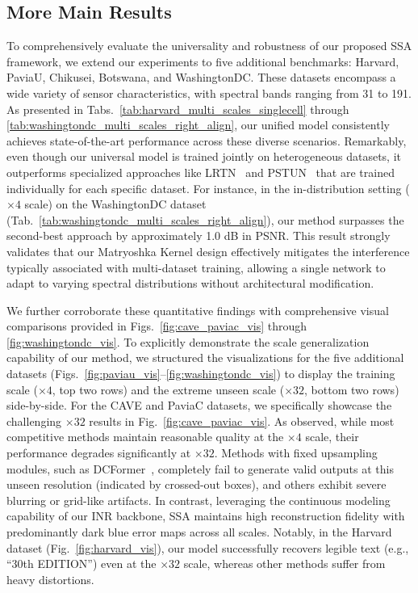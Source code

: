 \subsection{More Main Results}
\label{sec:add_res}
To comprehensively evaluate the universality and robustness of our proposed SSA framework, we extend our experiments to five additional benchmarks: Harvard, PaviaU, Chikusei, Botswana, and WashingtonDC. These datasets encompass a wide variety of sensor characteristics, with spectral bands ranging from 31 to 191. As presented in Tabs.~\ref{tab:harvard_multi_scales_singlecell} through \ref{tab:washingtondc_multi_scales_right_align}, our unified model consistently achieves state-of-the-art performance across these diverse scenarios. Remarkably, even though our universal model is trained jointly on heterogeneous datasets, it outperforms specialized approaches like LRTN~\cite{liu2025low} and PSTUN~\cite{wang2025perceptive} that are trained individually for each specific dataset. For instance, in the in-distribution setting ($\times 4$ scale) on the WashingtonDC dataset (Tab.~\ref{tab:washingtondc_multi_scales_right_align}), our method surpasses the second-best approach by approximately 1.0 dB in PSNR. This result strongly validates that our Matryoshka Kernel design effectively mitigates the interference typically associated with multi-dataset training, allowing a single network to adapt to varying spectral distributions without architectural modification.

We further corroborate these quantitative findings with comprehensive visual comparisons provided in Figs.~\ref{fig:cave_paviac_vis} through \ref{fig:washingtondc_vis}. To explicitly demonstrate the scale generalization capability of our method, we structured the visualizations for the five additional datasets (Figs.~\ref{fig:paviau_vis}--\ref{fig:washingtondc_vis}) to display the training scale ($\times 4$, top two rows) and the extreme unseen scale ($\times 32$, bottom two rows) side-by-side. 
For the CAVE and PaviaC datasets, we specifically showcase the challenging $\times 32$ results in Fig.~\ref{fig:cave_paviac_vis}.
As observed, while most competitive methods maintain reasonable quality at the $\times 4$ scale, their performance degrades significantly at $\times 32$. Methods with fixed upsampling modules, such as DCFormer~\cite{wu2025fully}, completely fail to generate valid outputs at this unseen resolution (indicated by crossed-out boxes), and others exhibit severe blurring or grid-like artifacts. In contrast, leveraging the continuous modeling capability of our INR backbone, SSA maintains high reconstruction fidelity with predominantly dark blue error maps across all scales. Notably, in the Harvard dataset (Fig.~\ref{fig:harvard_vis}), our model successfully recovers legible text (e.g., ``30th EDITION'') even at the $\times 32$ scale, whereas other methods suffer from heavy distortions.


